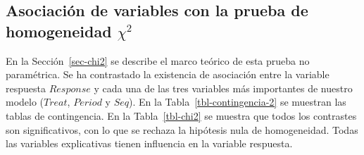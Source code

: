 \documentclass[
  12pt,
  a4paper,
  extrafontsizes,
  onecolumn,
  openright]{memoir}
\begin{document}
\normalsize

\hypertarget{sec-chi2-2}{%
\subsection{\texorpdfstring{Asociación de variables con la prueba de
homogeneidad
\(\chi^2\)}{Asociación de variables con la prueba de homogeneidad \textbackslash chi\^{}2}}\label{sec-chi2-2}}

En la Sección~\ref{sec-chi2} se describe el marco teórico de esta prueba
no paramétrica. Se ha contrastado la existencia de asociación entre la
variable respuesta \(Response\) y cada una de las tres variables más
importantes de nuestro modelo (\(Treat\), \(Period\) y \(Seq\)). En la
Tabla~\ref{tbl-contingencia-2} se muestran las tablas de contingencia.
En la Tabla~\ref{tbl-chi2} se muestra que todos los contrastes son
significativos, con lo que se rechaza la hipótesis nula de homogeneidad.
Todas las variables explicativas tienen influencia en la variable
respuesta.
\end{document}
